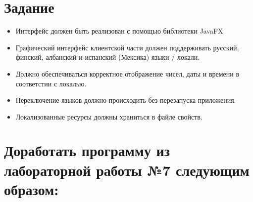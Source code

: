 \documentclass{article}
\begin{document}
\itmo[
  variant=1703,
  labn=8,
  discipline=Программирование,
  group=P3115,
  student=Владимир Мацюк,
  teacher=Кустарев Иван Павлович,
  year=2023,
  logo=../../lib/img/itmo.png
]

\section*{Задание}
\begin{itemize}
  \item Интерфейс должен быть реализован с помощью библиотеки JavaFX
  \item Графический интерфейс клиентской части должен поддерживать русский, финский, албанский и испанский (Мексика) языки / локали.
  \item Должно обеспечиваться корректное отображение чисел, даты и времени в соответстии с локалью.
  \item Переключение языков должно происходить без перезапуска приложения.
  \item Локализованные ресурсы должны храниться в файле свойств.
\end{itemize}
\section*{Доработать программу из лабораторной работы №7 следующим образом:}
\end{document}
